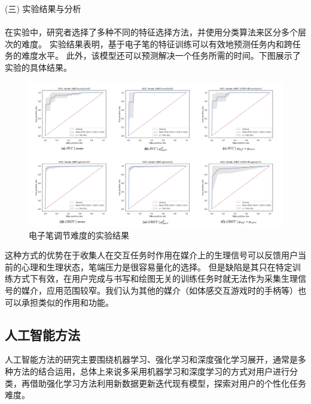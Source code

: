 \documentclass{article}
\begin{document}
            (三) 实验结果与分析\paragraph{}
            在实验中，研究者选择了多种不同的特征选择方法，并使用分类算法来区分多个层次的难度。
            实验结果表明，基于电子笔的特征训练可以有效地预测任务内和跨任务的难度水平。
            此外，该模型还可以预测解决一个任务所需的时间。下图展示了实验的具体结果。

            \begin{figure}[H]
        
            	\centering
            	\includegraphics[scale=0.3]{images/pen_result.png}
            	\caption{电子笔调节难度的实验结果}
            	\label{fig:label}
            \end{figure}

            这种方式的优势在于收集人在交互任务时作用在媒介上的生理信号可以反馈用户当前的心理和生理状态，笔端压力是很容易量化的选择。
            但是缺陷是其只在特定训练方式下有效，在用户完成与书写和绘图无关的训练任务时就无法作为采集生理信号的媒介，应用范围较窄。我们认为其他的媒介（如体感交互游戏时的手柄等）也可以承担类似的作用和功能。
            


            
        \subsection{人工智能方法}
        人工智能方法的研究主要围绕机器学习、强化学习和深度强化学习展开，通常是多种方法的结合运用，总体上来说多采用机器学习和深度学习的方式对用户进行分类，再借助强化学习方法利用新数据更新迭代现有模型，探索对用户的个性化任务难度。
\end{document}
